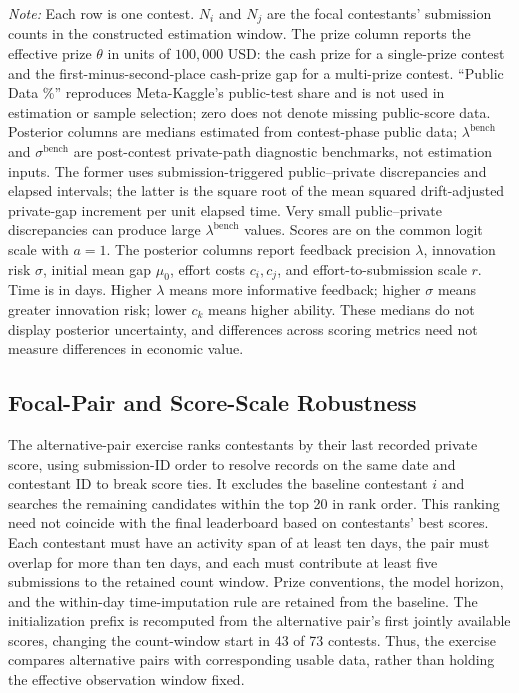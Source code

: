 \documentclass[mnsc]{informs3}
\begin{document}
\begin{APPENDICES}
{\begin{minipage}{\textwidth}
{\footnotesize\textit{Note:} Each row is one contest. $N_i$ and $N_j$ are the focal contestants' submission counts in the constructed estimation window. The prize column reports the effective prize $\theta$ in units of $100{,}000$ USD: the cash prize for a single-prize contest and the first-minus-second-place cash-prize gap for a multi-prize contest. ``Public Data \%'' reproduces Meta-Kaggle's public-test share and is not used in estimation or sample selection; zero does not denote missing public-score data. Posterior columns are medians estimated from contest-phase public data; $\lambda^{\mathrm{bench}}$ and $\sigma^{\mathrm{bench}}$ are post-contest private-path diagnostic benchmarks, not estimation inputs. The former uses submission-triggered public--private discrepancies and elapsed intervals; the latter is the square root of the mean squared drift-adjusted private-gap increment per unit elapsed time. Very small public--private discrepancies can produce large $\lambda^{\mathrm{bench}}$ values. Scores are on the common logit scale with $a=1$.} {The posterior columns report feedback precision $\lambda$, innovation risk $\sigma$, initial mean gap $\mu_0$, effort costs $c_i,c_j$, and effort-to-submission scale $r$. Time is in days. Higher $\lambda$ means more informative feedback; higher $\sigma$ means greater innovation risk; lower $c_k$ means higher ability. These medians do not display posterior uncertainty, and differences across scoring metrics need not measure differences in economic value.}
\end{minipage}
}




\subsection{Focal-Pair and Score-Scale Robustness}\label{app-robustness-statistics}





{The alternative-pair exercise ranks contestants by their last recorded private score, using submission-ID order to resolve records on the same date and contestant ID to break score ties. It excludes the baseline contestant $i$ and searches the remaining candidates within the top 20 in rank order. This ranking need not coincide with the final leaderboard based on contestants' best scores. Each contestant must have an activity span of at least ten days, the pair must overlap for more than ten days, and each must contribute at least five submissions to the retained count window. Prize conventions, the model horizon, and the within-day time-imputation rule are retained from the baseline. The initialization prefix is recomputed from the alternative pair's first jointly available scores, changing the count-window start in 43 of 73 contests. Thus, the exercise compares alternative pairs with corresponding usable data, rather than holding the effective observation window fixed.}


\end{APPENDICES}
\end{document}
